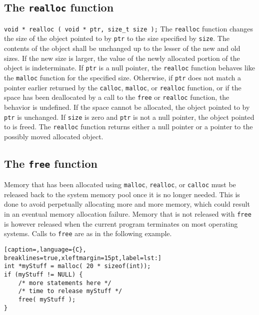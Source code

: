 \subsection{The \texttt{realloc} function}
\texttt{void * realloc ( void * ptr, size\_t size );}
The \texttt{realloc} function changes the size of the object pointed to by
\texttt{ptr} to the size specified by \texttt{size}. The contents of the object
shall be unchanged up to the lesser of the new and old sizes. If the new size
is larger, the value of the newly allocated portion of the object is
indeterminate. If \texttt{ptr} is a null pointer, the \texttt{realloc} function
behaves like the \texttt{malloc} function for the specified size. Otherwise, if
\texttt{ptr} does not match a pointer earlier returned by the \texttt{calloc},
\texttt{malloc}, or \texttt{realloc} function, or if the space has been
deallocated by a call to the \texttt{free} or \texttt{realloc} function, the
behavior is undefined. If the space cannot be allocated, the object pointed to
by \texttt{ptr} is unchanged. If \texttt{size} is zero and \texttt{ptr} is not
a null pointer, the object pointed to is freed. The \texttt{realloc} function
returns either a null pointer or a pointer to the possibly moved allocated
object.

\subsection{The \texttt{free} function}
Memory that has been allocated using \texttt{malloc}, \texttt{realloc}, or
\texttt{calloc} must be released back to the system memory pool once it is no
longer needed. This is done to avoid perpetually allocating more and more
memory, which could result in an eventual memory allocation failure. Memory
that is not released with \texttt{free} is however released when the current
program terminates on most operating systems. Calls to \texttt{free} are as in
the following example.
\lstset{basicstyle=\scriptsize, numbers=left, captionpos=b, tabsize=4}
\begin{lstlisting}[caption=,language={C},
breaklines=true,xleftmargin=15pt,label=lst:]
int *myStuff = malloc( 20 * sizeof(int)); 
if (myStuff != NULL) {
	/* more statements here */
	/* time to release myStuff */
	free( myStuff );
}
\end{lstlisting}

